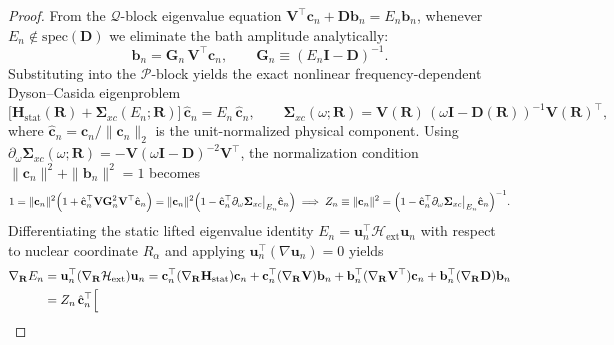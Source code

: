 \documentclass[10pt]{article}
\theoremstyle{natthm}
\newcommand{\Hext}{\mathcal{H}_{\mathrm{ext}}}
\begin{document}
\begin{proof}
From the $\mathcal{Q}$-block eigenvalue equation $\mathbf{V}^\top\mathbf{c}_n + \mathbf{D}\mathbf{b}_n = E_n\mathbf{b}_n$, whenever $E_n \notin \mathrm{spec}(\mathbf{D})$ we eliminate the bath amplitude analytically:
\begin{equation}
  \mathbf{b}_n = \mathbf{G}_n\,\mathbf{V}^\top\mathbf{c}_n, \qquad
  \mathbf{G}_n \equiv (E_n\mathbf{I} - \mathbf{D})^{-1}.
\end{equation}
Substituting into the $\mathcal{P}$-block yields the exact nonlinear frequency-dependent Dyson--Casida eigenproblem
\begin{equation}
  \bigl[\mathbf{H}_{\mathrm{stat}}(\mathbf{R}) + \mathbf{\Sigma}_{xc}(E_n; \mathbf{R})\bigr]\,\hat{\mathbf{c}}_n = E_n\,\hat{\mathbf{c}}_n, \qquad
  \mathbf{\Sigma}_{xc}(\omega; \mathbf{R}) = \mathbf{V}(\mathbf{R})\,(\omega\mathbf{I} - \mathbf{D}(\mathbf{R}))^{-1}\mathbf{V}(\mathbf{R})^\top,
\end{equation}
where $\hat{\mathbf{c}}_n = \mathbf{c}_n / \|\mathbf{c}_n\|_2$ is the unit-normalized physical component.
Using $\partial_\omega \mathbf{\Sigma}_{xc}(\omega; \mathbf{R}) = -\mathbf{V}(\omega\mathbf{I}-\mathbf{D})^{-2}\mathbf{V}^\top$, the normalization condition $\|\mathbf{c}_n\|^2 + \|\mathbf{b}_n\|^2 = 1$ becomes
\begin{equation}
  1 = \|\mathbf{c}_n\|^2 \Bigl(1 + \hat{\mathbf{c}}_n^\top \mathbf{V}\mathbf{G}_n^2\mathbf{V}^\top\hat{\mathbf{c}}_n\Bigr)
    = \|\mathbf{c}_n\|^2 \Bigl(1 - \hat{\mathbf{c}}_n^\top \bigl.\partial_\omega\mathbf{\Sigma}_{xc}\bigr|_{E_n}\hat{\mathbf{c}}_n\Bigr)
  \;\Longrightarrow\;
  Z_n \equiv \|\mathbf{c}_n\|^2 = \Bigl(1 - \hat{\mathbf{c}}_n^\top \bigl.\partial_\omega\mathbf{\Sigma}_{xc}\bigr|_{E_n}\hat{\mathbf{c}}_n\Bigr)^{-1}.
\end{equation}
Differentiating the static lifted eigenvalue identity $E_n = \mathbf{u}_n^\top\Hext\mathbf{u}_n$ with respect to nuclear coordinate $R_\alpha$ and applying $\mathbf{u}_n^\top(\nabla\mathbf{u}_n)=0$ yields
\begin{align}
  \nabla_{\mathbf{R}} E_n
  &= \mathbf{u}_n^\top (\nabla_{\mathbf{R}}\Hext)\mathbf{u}_n
   = \mathbf{c}_n^\top (\nabla_{\mathbf{R}}\mathbf{H}_{\mathrm{stat}})\mathbf{c}_n
   + \mathbf{c}_n^\top (\nabla_{\mathbf{R}}\mathbf{V})\mathbf{b}_n
   + \mathbf{b}_n^\top (\nabla_{\mathbf{R}}\mathbf{V}^\top)\mathbf{c}_n
   + \mathbf{b}_n^\top (\nabla_{\mathbf{R}}\mathbf{D})\mathbf{b}_n \nonumber \\
  &= Z_n\,\hat{\mathbf{c}}_n^\top \Bigl[

\end{align}
\end{proof}
\end{document}
